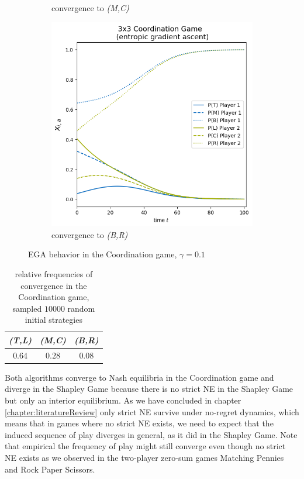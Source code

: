 \begin{figure}[H]
\begin{subfigure}{.5\textwidth}
    \caption{convergence to \textit{(M,C)}}
    \label{fig:Coordination3x3b}
\end{subfigure}
\begin{subfigure}{.5\textwidth}
    \centering
    \includegraphics[width=\textwidth]{logos/Coordination3x3-3.png}
    \caption{convergence to \textit{(B,R)}}
    \label{fig:Coordination3x3c}
\end{subfigure}%
\caption{EGA behavior in the Coordination game, $\gamma = 0.1$}
\label{fig:Coordination3x3}
\end{figure}

\begin{table}[H]
\centering
\captionsetup{justification=centering}
 \begin{tabular}{||c c c||} 
 \hline
 \textit{(T,L)} & \textit{(M,C)} & \textit{(B,R)} \\ [0.5ex] 
 \hline\hline
 $0.64$ & $0.28$ & $0.08$ \\ [1ex] 
 \hline
 \end{tabular}\caption{\label{tab:frequencies}relative frequencies of convergence in the Coordination game, \\ sampled $10000$ random initial strategies}
\end{table}

Both algorithms converge to Nash equilibria in the Coordination game and diverge in the Shapley Game because there is no strict NE in the Shapley Game but only an interior equilibrium. As we have concluded in chapter \ref{chapter:literatureReview} only strict NE survive under no-regret dynamics, which means that in games where no strict NE exists, we need to expect that the induced sequence of play diverges in general, as it did in the Shapley Game. Note that empirical the frequency of play might still converge even though no strict NE exists as we observed in the two-player zero-sum games Matching Pennies and Rock Paper Scissors. 


